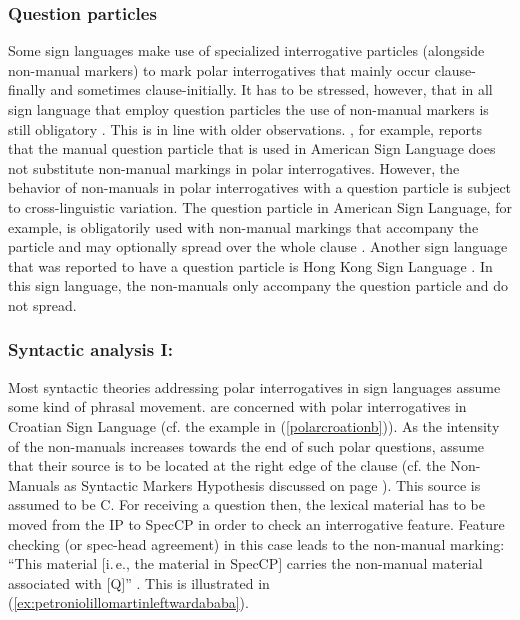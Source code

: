 \subsubsection{Question particles}
Some sign languages make use of specialized interrogative particles (alongside non-manual markers) to mark polar interrogatives that mainly occur clause-finally and sometimes clause-initially. It has to be stressed, however, that in all sign language that employ question particles the use of non-manual markers is still obligatory \citep[21]{zeshan2004interrogative}. This is in line with older observations. \citet{liddell1977non}, for example, reports that the manual question particle that is used in American Sign Language does not substitute non-manual markings in polar interrogatives. However, the behavior of non-manuals in polar interrogatives with a question particle is subject to cross-linguistic variation. The question particle in American Sign Language, for example, is obligatorily used with non-manual markings that accompany the particle and may optionally spread over the  whole clause \citep[122--124]{neidle2000syntax}. Another sign language that was reported to have a question particle is Hong Kong Sign Language \citep[206]{tang2006questions}. In this sign language, the non-manuals only accompany the question particle and do not spread. 

\subsubsection{Syntactic analysis I: \citet{sarac2006interrogative}}
Most syntactic theories addressing polar interrogatives in sign languages assume some kind of phrasal movement. \citet{sarac2006interrogative} are concerned with polar interrogatives in Croatian Sign Language (cf. the example in (\ref{polarcroationb})). 
As the intensity of the non-manuals increases towards the end of such polar questions, \citet{sarac2006interrogative} assume that their source is to be located at the right edge of the clause (cf. the Non-Manuals as Syntactic Markers Hypothesis discussed on page \pageref{nmasmh}). This source is assumed to be C\textdegree . For receiving a question then, the lexical material has to be moved from the IP to SpecCP in order to check an interrogative feature. Feature checking (or spec-head agreement) in this case leads to the non-manual marking: ``This material $[$i.\,e., the material in SpecCP$]$ carries the non-manual material associated with $[$Q$]$'' \citep[222]{sarac2006interrogative}. This is illustrated in (\ref{ex:petroniolillomartinleftwardababa}).

